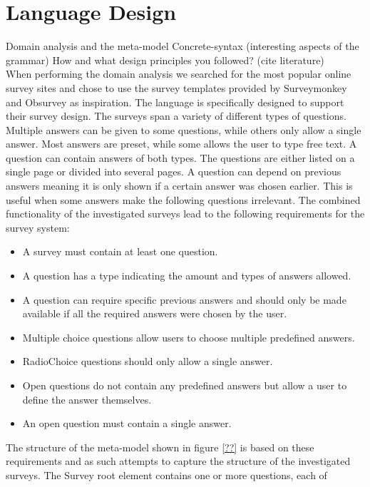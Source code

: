\documentclass[runningheads]{llncs}
\begin{document}
\section{Language Design}
Domain analysis and the meta-model
Concrete-syntax (interesting aspects of the grammar)
How and what design principles you followed? (cite literature) \\
When performing the domain analysis we searched for the most popular online survey sites and chose to use the survey templates provided by Surveymonkey\cite{surveymonkey} and Obsurvey\cite{obsurvey} as inspiration. The language is specifically designed to support their survey design. The surveys span a variety of different types of questions. Multiple answers can be given to some questions, while others only allow a single answer. Most answers are preset, while some allows the user to type free text. A question can contain answers of both types. The questions are either listed on a single page or divided into several pages. A question can depend on previous answers meaning it is only shown if a certain answer was chosen earlier. This is useful when some answers make the following questions irrelevant. The combined functionality of the investigated surveys lead to the following requirements for the survey system:
\begin{itemize}
\item  A survey must contain at least one question. 
\item A question has a type indicating the amount and types of answers allowed. 
\item A question can require specific previous answers and should only be made available if all the required answers were chosen by the user. 
\item Multiple choice questions allow users to choose multiple predefined answers.
\item RadioChoice questions should only allow a single answer. 
\item Open questions do not contain any predefined answers but allow a user to define the answer themselves. 
\item An open question must contain a single answer.
\end{itemize}
The structure of the meta-model shown in figure \ref{??} is based on these requirements and as such attempts to capture the structure of the investigated surveys. The Survey root element contains one or more questions, each of 
\medskip
\end{document}
